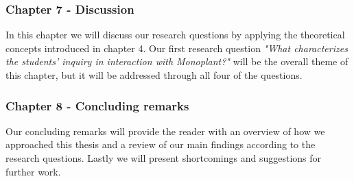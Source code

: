 \subsubsection*{Chapter 7 - Discussion}
In this chapter we will discuss our research questions by applying the theoretical concepts introduced in chapter 4. Our first research question \emph{"What characterizes the students’ inquiry in interaction with Monoplant?"} will be the overall theme of this chapter, but it will be addressed through all four of the questions.

\subsubsection*{Chapter 8 - Concluding remarks}
Our concluding remarks will provide the reader with an overview of how we approached this thesis and a review of our main findings according to the research questions. Lastly we will present shortcomings and suggestions for further work.